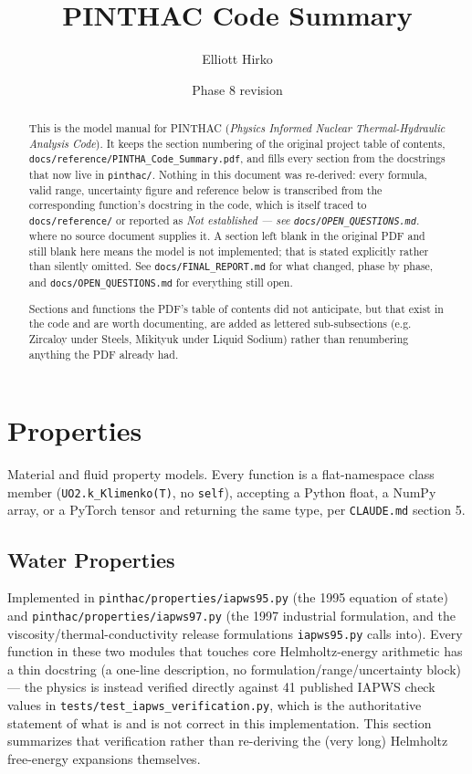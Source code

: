 \documentclass[11pt]{article}
\title{PINTHAC Code Summary}
\author{Elliott Hirko}
\date{Phase 8 revision}
\newcommand{\code}[1]{\texttt{#1}}
\newcommand{\notest}{\textit{Not established --- see \code{docs/OPEN\_QUESTIONS.md}.}}
\begin{document}
\maketitle

\begin{abstract}
This is the model manual for PINTHAC (\emph{Physics Informed Nuclear
Thermal-Hydraulic Analysis Code}). It keeps the section numbering of the original
project table of contents, \code{docs/reference/PINTHA\_Code\_Summary.pdf}, and fills
every section from the docstrings that now live in \code{pinthac/}. Nothing in this
document was re-derived: every formula, valid range, uncertainty figure and reference
below is transcribed from the corresponding function's docstring in the code, which is
itself traced to \code{docs/reference/} or reported as \notest{} where no source
document supplies it. A section left blank in the original PDF and still blank here
means the model is not implemented; that is stated explicitly rather than silently
omitted. See \code{docs/FINAL\_REPORT.md} for what changed, phase by phase, and
\code{docs/OPEN\_QUESTIONS.md} for everything still open.

Sections and functions the PDF's table of contents did not anticipate, but that exist
in the code and are worth documenting, are added as lettered sub-subsections (e.g.
Zircaloy under Steels, Mikityuk under Liquid Sodium) rather than renumbering anything
the PDF already had.
\end{abstract}

\tableofcontents

\section{Properties}

Material and fluid property models. Every function is a flat-namespace class member
(\code{UO2.k\_Klimenko(T)}, no \code{self}), accepting a Python float, a NumPy array, or
a PyTorch tensor and returning the same type, per \code{CLAUDE.md} section 5.

\subsection{Water Properties}

Implemented in \code{pinthac/properties/iapws95.py} (the 1995 equation of state) and
\code{pinthac/properties/iapws97.py} (the 1997 industrial formulation, and the
viscosity/thermal-conductivity release formulations \code{iapws95.py} calls into).
Every function in these two modules that touches core Helmholtz-energy arithmetic has a
thin docstring (a one-line description, no formulation/range/uncertainty block) --- the
physics is instead verified directly against 41 published IAPWS check values in
\code{tests/test\_iapws\_verification.py}, which is the authoritative statement of what
is and is not correct in this implementation. This section summarizes that verification
rather than re-deriving the (very long) Helmholtz free-energy expansions themselves.
\end{document}

